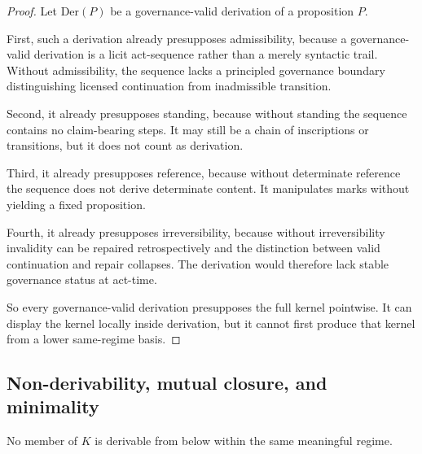 \begin{proof}
Let $\mathrm{Der}(P)$ be a governance-valid derivation of a proposition $P$.

First, such a derivation already presupposes admissibility, because a governance-valid derivation is a licit act-sequence rather than a merely syntactic trail. Without admissibility, the sequence lacks a principled governance boundary distinguishing licensed continuation from inadmissible transition.

Second, it already presupposes standing, because without standing the sequence contains no claim-bearing steps. It may still be a chain of inscriptions or transitions, but it does not count as derivation.

Third, it already presupposes reference, because without determinate reference the sequence does not derive determinate content. It manipulates marks without yielding a fixed proposition.

Fourth, it already presupposes irreversibility, because without irreversibility invalidity can be repaired retrospectively and the distinction between valid continuation and repair collapses. The derivation would therefore lack stable governance status at act-time.

So every governance-valid derivation presupposes the full kernel pointwise. It can display the kernel locally inside derivation, but it cannot first produce that kernel from a lower same-regime basis.\cite{MaleyFoundationalClosure}
\end{proof}

\subsection{Non-derivability, mutual closure, and minimality}

\begin{theorem}
\label{thm:kernel-nonderivability}
No member of $K$ is derivable from below within the same meaningful regime.
\end{theorem}

